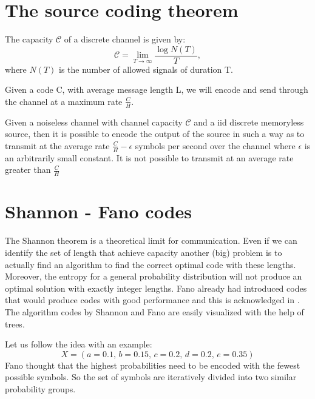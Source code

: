 \section{The source coding theorem}
\begin{definition}
	The capacity $\mathcal{C}$ of a discrete channel is given by:
	\begin{equation}
		\mathcal{C} = \lim_{T\rightarrow \infty} \frac{\log N(T)}{T},
	\end{equation}
	where $N(T)$ is the number of allowed signals of duration T.
\end{definition}
Given a code C, with average message length L, we will encode and send through the channel at a maximum rate $\frac{C}{H}$.
\begin{theorem}
	Given a noiseless channel with channel capacity $\mathcal{C}$ and a iid discrete memoryless source, then it is possible to encode the output of the source in such a way as to transmit at the average rate $\frac{C}{H} -\epsilon$ symbols per second over the channel where $\epsilon$ is an arbitrarily small constant. It is not possible to transmit at an average rate greater than $\frac{C}{H}$
\end{theorem}

\section{Shannon - Fano codes}
The Shannon theorem is a theoretical limit for communication. Even if we can identify the set of length that achieve capacity another (big) problem is to actually find an algorithm to find the correct optimal code with these lengths. Moreover, the entropy for a general probability distribution will not produce an optimal solution with exactly integer lengths. Fano already had introduced codes that would produce codes with good performance and this is acknowledged in \cite{shannon}.
The algorithm codes by Shannon and Fano are easily visualized with the help of trees. 

Let us follow the idea with an example: $$X = (a=0.1,\, b=0.15,\, c=0.2,\, d=0.2,\, e=0.35)$$
Fano thought that the highest probabilities need to be encoded with the fewest possible symbols. So the set of symbols are iteratively divided into two similar probability groups.

